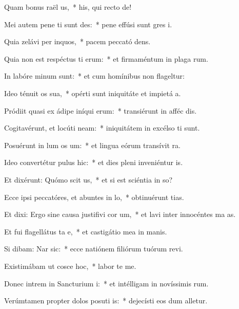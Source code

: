 \item Quam bonus raël us,~* his, qui recto  de!
\item Mei autem pene ti sunt des:~* pene effúsi sunt gres i.
\item Quia zelávi per inquos,~* pacem peccató dens.
\item Quia non est respéctus ti erum:~* et firmaméntum in plaga rum.
\item In labóre minum  sunt:~* et cum homínibus non flageltur:
\item Ideo ténuit os sua,~* opérti sunt iniquitáte et impietá a.
\item Pródiit quasi ex ádipe iníqui erum:~* transiérunt in afféc dis.
\item Cogitavérunt, et locúti  neam:~* iniquitátem in excélso ti sunt.
\item Posuérunt in lum os um:~* et lingua eórum transívit  ra.
\item Ideo convertétur pulus  hic:~* et dies pleni inveniéntur  is.
\item Et dixérunt: Quómo scit us,~* et si est sciéntia in so?
\item Ecce ipsi peccatóres, et abuntes in lo,~* obtinuérunt tias.
\item Et dixi: Ergo sine causa justifivi cor um,~* et lavi inter innocéntes ma as.
\item Et fui flagellátus ta e,~* et castigátio mea in manis.
\item Si dibam: Nar sic:~* ecce natiónem filiórum tuórum revi.
\item Existimábam ut cosce hoc,~* labor  te me.
\item Donec intrem in Sancturium i:~* et intélligam in novíssimis rum.
\item Verúmtamen propter dolos posuti is:~* dejecísti eos dum alletur.
